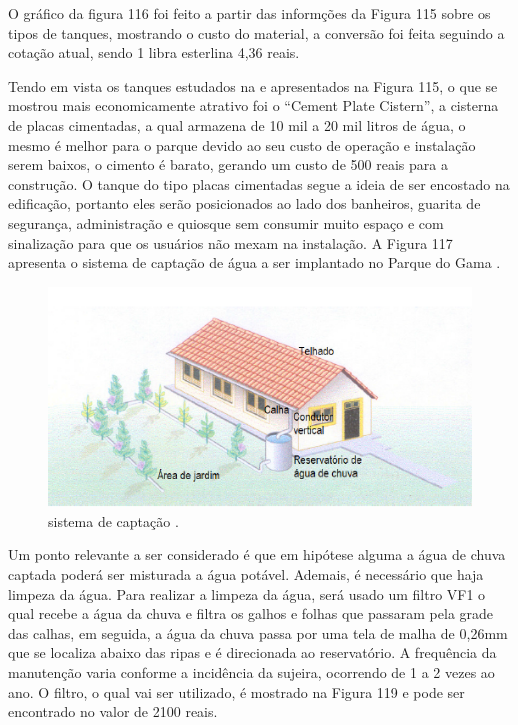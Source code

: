 O gráfico da figura 116 foi feito a partir das informções da Figura 115 sobre os tipos de tanques, mostrando o custo do material, a conversão foi feita seguindo a cotação atual, sendo 1 libra esterlina 4,36 reais.

Tendo em vista os tanques estudados na e apresentados na Figura 115, o que se mostrou mais economicamente atrativo foi o “Cement Plate Cistern”, a cisterna de placas cimentadas, a qual armazena de 10 mil a 20 mil litros de água, o mesmo é melhor para o parque devido ao seu custo de operação e instalação serem baixos, o cimento é barato, gerando um custo de 500 reais para a construção. O tanque do tipo placas cimentadas segue a ideia de ser encostado na edificação, portanto eles serão posicionados ao lado dos banheiros, guarita de segurança, administração e quiosque sem consumir muito espaço e com sinalização para que os usuários não mexam na instalação. A Figura 117 apresenta o sistema de captação de água a ser implantado no Parque do Gama \cite{gnadlinger1999technical}. 

\begin{figure}[H]
	 \centering
	\label{sistema de captação}
	 \includegraphics[scale=0.6]{captacao/9.png}
	 \caption{sistema de captação \cite{WATERFALL}.}
\end{figure}

Um ponto relevante a ser considerado é que em hipótese alguma a água de chuva captada poderá ser misturada a água potável. Ademais, é necessário que haja limpeza da água. Para realizar a limpeza da água, será usado um filtro VF1 o qual recebe a água da chuva e filtra os galhos e folhas que passaram pela grade das calhas, em seguida, a água da chuva passa por uma tela de malha de 0,26mm que se localiza abaixo das ripas e é direcionada ao reservatório. A frequência da manutenção varia conforme a incidência da sujeira, ocorrendo de 1 a 2 vezes ao ano. O filtro, o qual vai ser utilizado, é mostrado na Figura 119 e pode ser encontrado no valor de 2100 reais. 



